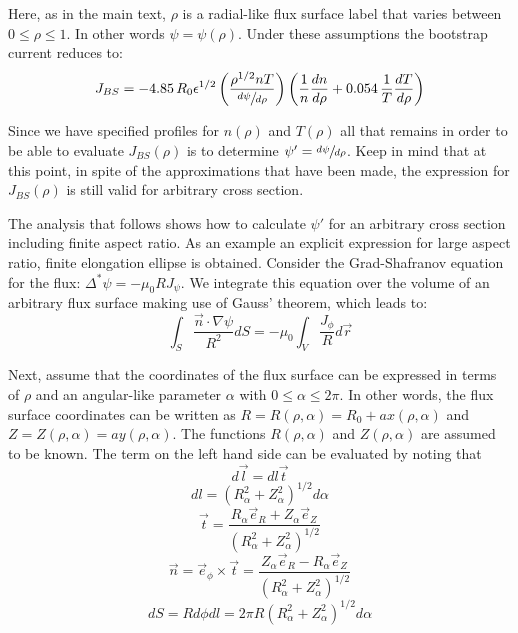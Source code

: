 Here, as in the main text, $\rho$ is a radial-like flux surface label that varies between $0 \le \rho \le 1 $. In other words $\psi = \psi(\rho)$. Under these assumptions the bootstrap current reduces to:
\begin{equation}
	\label{eq:bs_start}
	J_{BS} = -4.85 \, R_0 \epsilon^{1/2} \left( \frac{ \rho^{1/2} n T }{ \sfrac{d\psi}{d\rho}} \right) \left( \frac{1}{n} \frac{dn}{d\rho} + 0.054 \, \frac{1}{T} \frac{dT}{d\rho} \right)
\end{equation}

Since we have specified profiles for $n(\rho)$ and $T(\rho)$ all that remains in order to be able to evaluate $J_{BS}(\rho)$ is to determine $\psi' = \sfrac{d\psi}{d\rho}$. Keep in mind that at this point, in spite of the approximations that have been made, the expression for $J_{BS}(\rho)$ is still valid for arbitrary cross section.

The analysis that follows shows how to calculate $\psi'$ for an arbitrary cross section including finite aspect ratio. As an example an explicit expression for large aspect ratio, finite elongation ellipse is obtained. Consider the Grad-Shafranov equation for the flux: $\Delta^* \psi = -\mu_0 R J_\psi$. We integrate this equation over the volume of an arbitrary flux surface making use of Gauss' theorem, which leads to:
\begin{equation}
	\label{eq:gauss}
	\int_S \frac{ \vec n \cdot \nabla \psi }{R^2} dS = -\mu_0 \int_V \frac{ J_\phi}{R} d \vec r
\end{equation}

Next, assume that the coordinates of the flux surface can be expressed in terms of $\rho$ and an angular-like parameter $\alpha$ with $0 \le \alpha \le 2 \pi$. In other words, the flux surface coordinates can be written as $R = R(\rho,\alpha) = R_0 + a x(\rho, \alpha)$ and $Z = Z(\rho,\alpha) = a y(\rho, \alpha)$. The functions $R(\rho,\alpha)$ and $Z(\rho,\alpha)$ are assumed to be known. The term on the left hand side can be evaluated by noting that
\begin{equation}
	d \vec l = dl \vec t
\end{equation}
\begin{equation}
	dl = ( R_\alpha^2 + Z_\alpha^2 )^{1/2} d\alpha
\end{equation}
\begin{equation}
	\vec t = \frac{R_\alpha \vec e_R + Z_\alpha \vec e_Z }{ ( R_\alpha^2 + Z_\alpha^2 )^{1/2} }
\end{equation}
\begin{equation}
	\vec n = \vec e_\phi \times \vec t = \frac{ Z_\alpha \vec e_R - R_\alpha \vec e_Z }{ ( R_\alpha^2 + Z_\alpha^2 )^{1/2} }
\end{equation}
\begin{equation}
	dS = R d \phi d l  = 2 \pi R ( R_\alpha^2 + Z_\alpha^2 )^{1/2} d \alpha
\end{equation}

